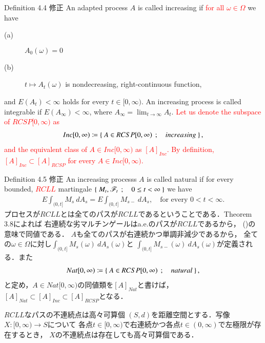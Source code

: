 	\begin{itembox}[l]{Definition 4.4 修正}
		An adapted process $A$ is called increasing if \textcolor{red}{for all $\omega \in \Omega$} we have
		\begin{description}
			\item[(a)] $A_0(\omega) = 0$
			\item[(b)] $t \longmapsto A_t(\omega)$ is nondecreasing, right-continuous function,
		\end{description}
		and $E(A_t) < \infty$ holds for every $t \in [0,\infty)$.
		An increasing process is called integrable if $E(A_\infty) < \infty$,
		where $A_\infty = \lim_{t \to \infty} A_t$.
		\textcolor{red}{Let us denote the subspace of $RCSP[0,\infty)$ as
		\begin{align}
			Inc[0,\infty) \coloneqq 
			\left\{\ A \in RCSP[0,\infty)\ \, ; \quad increasing\ \right\},
		\end{align}
		and the equivalent class of $A \in Inc[0,\infty)$ as $[A]_{Inc}$.
		By definition, $[A]_{Inc} \subset [A]_{RCSP}$ for every $A \in Inc[0,\infty)$.}
	\end{itembox}
	
	\begin{itembox}[l]{Definition 4.5 修正}
		An increasing processs $A$ is called natural if for every bounded, 
		\textcolor{red}{$RCLL$} martingale $\left\{\ M_t,\mathscr{F}_t\ \, ; \quad 0 \leq t < \infty\ \right\}$ we have
		\begin{align}
			E \int_{(0,t]} M_s\ dA_s = E \int_{(0,t]} M_{s-}\ dA_s,
			\quad \mbox{for every $0 < t < \infty$}.
		\end{align}
		プロセスが$RCLL$とは全てのパスが$RCLL$であるということである．Theorem 3.8によれば
		右連続な劣マルチンゲールはa.e.のパスが$RCLL$であるから，
		()の意味で同値である．
		$A$も全てのパスが右連続かつ単調非減少であるから，
		全ての$\omega \in \Omega$に対し$\int_{(0,t]} M_s(\omega)\ dA_s(\omega)$と
		$\int_{(0,t]} M_{s-}(\omega)\ dA_s(\omega)$が定義される．また
		\begin{align}
			Nat[0,\infty) \coloneqq
			\left\{\ A \in RCSP[0,\infty)\ \, ; \quad natural\ \right\},
		\end{align}
		と定め，$A \in Nat[0,\infty)$の同値類を$[A]_{Nat}$と書けば，
		$[A]_{Nat} \subset [A]_{Inc} \subset [A]_{RCSP}$となる．
	\end{itembox}
	
	\begin{itembox}[l]{$RCLL$なパスの不連続点は高々可算個}
		$(S,d)$を距離空間とする．写像$X:[0,\infty) \longrightarrow S$について
		各点$t \in [0,\infty)$で右連続かつ各点$t \in (0,\infty)$で左極限が存在するとき，
		$X$の不連続点は存在しても高々可算個である．
	\end{itembox}
	
